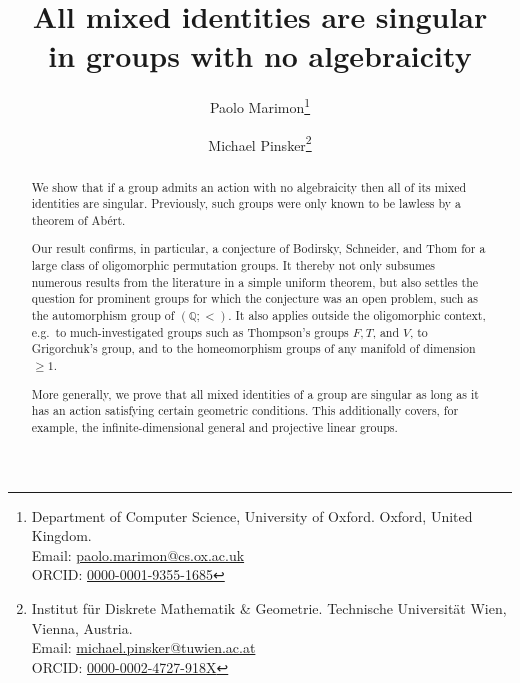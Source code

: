 \documentclass{article}
\title%
{All mixed identities are singular\\ in groups with no algebraicity}
\author{Paolo Marimon\thanks{%
Department of Computer Science, University of Oxford. Oxford, United Kingdom.\\
Email: \href{mailto:paolo.marimon@cs.ox.ac.uk}{paolo.marimon@cs.ox.ac.uk}\\
ORCID: \href{https://orcid.org/0000-0001-9355-1685}{0000-0001-9355-1685} \orcidlink{0000-0001-9355-1685}
}\and Michael Pinsker\thanks{%
Institut f\"ur Diskrete Mathematik \& Geometrie. Technische Universit\"{a}t Wien, Vienna, Austria.\\
Email: \href{mailto:michael.pinsker@tuwien.ac.at}{michael.pinsker@tuwien.ac.at}\\
ORCID: \href{https://orcid.org/0000-0002-4727-918X}{0000-0002-4727-918X} \orcidlink{0000-0002-4727-918X}}}
\date{}
\theoremstyle{remark}
\theoremstyle{definition}
\newcommand{\remmic}[1]{\textcolor{orange}{MP: #1}}
\begin{document}
\maketitle
\begin{abstract}
We show that if {a group}  admits an action with no algebraicity %
then all of its mixed identities are singular. Previously, such groups were only known to be lawless by a theorem of Ab\'{e}rt. %

Our  result 
confirms, in particular, a conjecture of Bodirsky, Schneider, and Thom for a large class of oligomorphic permutation groups. It thereby not only subsumes
numerous results from the literature 
in a simple uniform theorem, but also settles the question for prominent groups for which the conjecture was an open problem, such as the automorphism group of $(\mathbb{Q}; <)$. It also  applies outside the oligomorphic context, e.g.~to much-investigated groups such as  %
 Thompson's groups $F, T$, and $V$, %
to Grigorchuk’s group, and to the homeomorphism groups of any manifold of dimension $\geq 1$. 


More generally, we prove that all mixed identities of {a group}  are singular as long as it has an action satisfying certain geometric conditions. This additionally covers, for example, the infinite-dimensional general and projective linear groups. %

\end{abstract}
\end{document}
